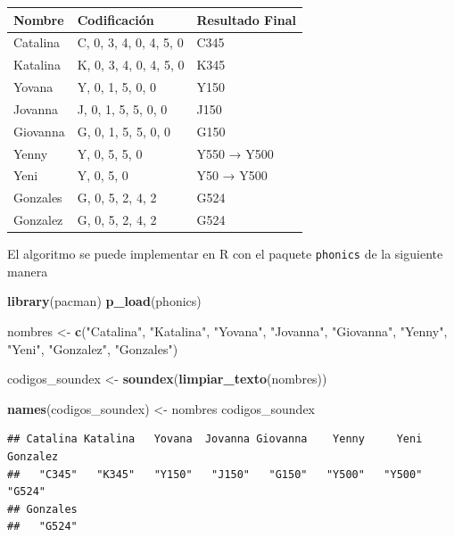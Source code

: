 \documentclass[
  12pt,
]{book}
\newenvironment{Shaded}{\begin{snugshade}}{\end{snugshade}}
\newcommand{\FunctionTok}[1]{\textcolor[rgb]{0.13,0.29,0.53}{\textbf{#1}}}
\newcommand{\NormalTok}[1]{#1}
\newcommand{\OtherTok}[1]{\textcolor[rgb]{0.56,0.35,0.01}{#1}}
\newcommand{\StringTok}[1]{\textcolor[rgb]{0.31,0.60,0.02}{#1}}
\begin{document}
\begin{longtable}[]{@{}lll@{}}
\toprule\noalign{}
Nombre & Codificación & Resultado Final \\
\midrule\noalign{}
\endhead
\bottomrule\noalign{}
\endlastfoot
Catalina & C, 0, 3, 4, 0, 4, 5, 0 & C345 \\
Katalina & K, 0, 3, 4, 0, 4, 5, 0 & K345 \\
Yovana & Y, 0, 1, 5, 0, 0 & Y150 \\
Jovanna & J, 0, 1, 5, 5, 0, 0 & J150 \\
Giovanna & G, 0, 1, 5, 5, 0, 0 & G150 \\
Yenny & Y, 0, 5, 5, 0 & Y550 → Y500 \\
Yeni & Y, 0, 5, 0 & Y50 → Y500 \\
Gonzales & G, 0, 5, 2, 4, 2 & G524 \\
Gonzalez & G, 0, 5, 2, 4, 2 & G524 \\
\end{longtable}

El algoritmo se puede implementar en R con el paquete \texttt{phonics} \citep{howard2020phonetic} de la siguiente manera

\begin{Shaded}
\begin{Highlighting}[]
\FunctionTok{library}\NormalTok{(pacman)}
\FunctionTok{p\_load}\NormalTok{(phonics)}

\NormalTok{nombres }\OtherTok{\textless{}{-}} \FunctionTok{c}\NormalTok{(}\StringTok{"Catalina"}\NormalTok{, }\StringTok{"Katalina"}\NormalTok{, }\StringTok{"Yovana"}\NormalTok{, }\StringTok{"Jovanna"}\NormalTok{, }\StringTok{"Giovanna"}\NormalTok{, }\StringTok{"Yenny"}\NormalTok{, }\StringTok{"Yeni"}\NormalTok{, }\StringTok{"Gonzalez"}\NormalTok{, }\StringTok{"Gonzales"}\NormalTok{)}

\NormalTok{codigos\_soundex }\OtherTok{\textless{}{-}} \FunctionTok{soundex}\NormalTok{(}\FunctionTok{limpiar\_texto}\NormalTok{(nombres))  }

\FunctionTok{names}\NormalTok{(codigos\_soundex) }\OtherTok{\textless{}{-}}\NormalTok{ nombres}
\NormalTok{codigos\_soundex}
\end{Highlighting}
\end{Shaded}

\begin{verbatim}
## Catalina Katalina   Yovana  Jovanna Giovanna    Yenny     Yeni Gonzalez 
##   "C345"   "K345"   "Y150"   "J150"   "G150"   "Y500"   "Y500"   "G524" 
## Gonzales 
##   "G524"
\end{verbatim}
\end{document}
